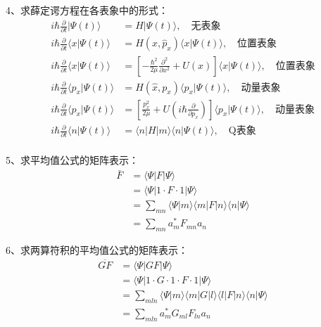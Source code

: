 \begin{frame} 
    4、求薛定谔方程在各表象中的形式： 
    $$ \begin{aligned}
    i \hbar \frac{\partial}{\partial t} |\Psi(t) \rangle &= H |\Psi(t) \rangle  , \quad \text{无表象}\\
    i \hbar \frac{\partial}{\partial t} \langle x|\Psi(t) \rangle &= H (x, \hat{p}_x) \langle x|\Psi(t) \rangle  , \quad \text{位置表象}\\
    i \hbar \frac{\partial}{\partial t} \langle x|\Psi(t) \rangle &= [- \frac{\hbar^2}{2\mu} \frac{\partial ^2 }{\partial x^2} + U(x)] \langle x|\Psi(t) \rangle  , \quad \text{位置表象}\\
    i \hbar \frac{\partial}{\partial t} \langle p_x|\Psi(t) \rangle &= H (\hat{x}, p_x) \langle p_x|\Psi(t) \rangle  , \quad \text{动量表象}\\
    i \hbar \frac{\partial}{\partial t} \langle p_x|\Psi(t) \rangle &=  [ \frac{p^2 _x}{2\mu} + U(i \hbar \frac{\partial }{\partial p_x}) ] \langle p_x|\Psi(t) \rangle  , \quad \text{动量表象}\\
    i \hbar \frac{\partial}{\partial t} \langle n|\Psi(t) \rangle &=  \langle n|H|m \rangle \langle n |\Psi(t) \rangle  , \quad \text{Q表象}\\
    \end{aligned}
    $$
\end{frame} 

\begin{frame} 
    5、求平均值公式的矩阵表示： 
    $$ \begin{aligned}
    \bar{F} &= \langle \Psi |F |\Psi \rangle  \\
    &= \langle \Psi |1 \cdot F \cdot 1 |\Psi \rangle  \\
    &= \sum_{mn} \langle \Psi |m\rangle\langle m |F| n\rangle\langle n |\Psi \rangle  \\
    &= \sum_{mn} a_m ^* F_{mn} a_n 
    \end{aligned}
    $$
\end{frame} 

\begin{frame} 
    6、求两算符积的平均值公式的矩阵表示： 
    $$ \begin{aligned}
    \overline{GF} &= \langle \Psi |GF |\Psi \rangle  \\
    &= \langle \Psi |1 \cdot G \cdot 1 \cdot F \cdot 1 |\Psi \rangle  \\
    &= \sum_{mln} \langle \Psi |m\rangle\langle m |G |l\rangle\langle l| F| n\rangle\langle n |\Psi \rangle  \\
    &= \sum_{mln} a_m ^* G_{ml} F_{ln} a_n 
    \end{aligned}
    $$
\end{frame} 


